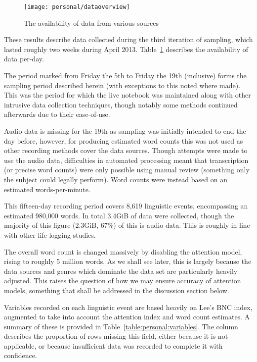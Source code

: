 

\begin{figure}[hp]
    \centering
    \begin{sideways}
        \texttt{[image: personal/dataoverview]}
    \end{sideways}
    \caption{The availability of data from various sources}
    \label{fig:personal:dataoverview}
\end{figure}

These results describe data collected during the third iteration of sampling, which lasted roughly two weeks during April 2013.  Table~\ref{fig:personal:dataoverview} describes the availability of data per-day.

The period marked from Friday the 5th to Friday the 19th (inclusive) forms the sampling period described herein (with exceptions to this noted where made).  This was the period for which the live notebook was maintained along with other intrusive data collection techniques, though notably some methods continued afterwards due to their ease-of-use.

Audio data is missing for the 19th as sampling was initially intended to end the day before, however, for producing estimated word counts this was not used as other recording methods cover the data sources.  Though attempts were made to use the audio data, difficulties in automated processing meant that transcription (or precise word counts) were only possible using manual review (something only the subject could legally perform).  Word counts were instead based on an estimated words-per-minute.


This fifteen-day recording period covers 8,619 linguistic events, encompassing an estimated 980,000 words.  In total 3.4GiB of data were collected, though the majority of this figure (2.3GiB, 67\%) of this is audio data.  This is roughly in line with other life-logging studies\cite{gemmell2006mylifebits}.

The overall word count is changed massively by disabling the attention model, rising to roughly 5 million words.  As we shall see later, this is largely because the data sources and genres which dominate the data set are particularly heavily adjusted.  This raises the question of how we may ensure accuracy of attention models, something that shall be addressed in the discussion section below.




Variables recorded on each linguistic event are based heavily on Lee's BNC index, augmented to take into account the attention index and word count estimates.  A summary of these is provided in Table~\ref{table:personal:variables}.  The  column describes the proportion of rows missing this field, either because it is not applicable, or because insufficient data was recorded to complete it with confidence.


